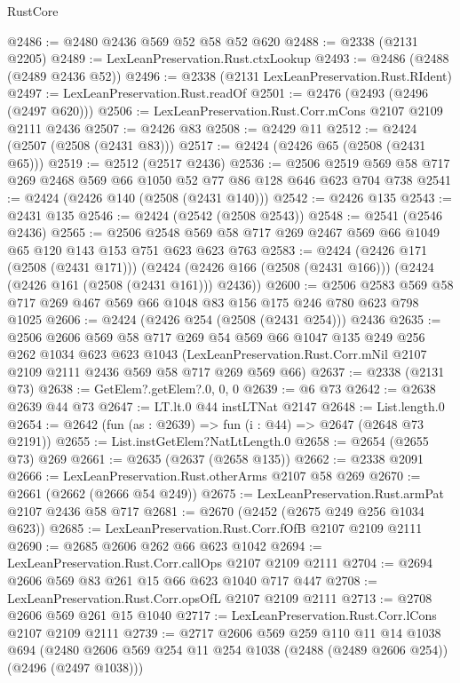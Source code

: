 \begin{lexlean}{RustCore}
\begin{coremodule}
@2486 := @2480 @2436 @569 @52 @58 @52 @620
@2488 := @2338 (@2131 @2205)
@2489 := LexLeanPreservation.Rust.ctxLookup
@2493 := @2486 (@2488 (@2489 @2436 @52))
@2496 := @2338 (@2131 LexLeanPreservation.Rust.RIdent)
@2497 := LexLeanPreservation.Rust.readOf
@2501 := @2476 (@2493 (@2496 (@2497 @620)))
@2506 := LexLeanPreservation.Rust.Corr.mCons @2107 @2109 @2111 @2436
@2507 := @2426 @83
@2508 := @2429 @11
@2512 := @2424 (@2507 (@2508 (@2431 @83)))
@2517 := @2424 (@2426 @65 (@2508 (@2431 @65)))
@2519 := @2512 (@2517 @2436)
@2536 := @2506 @2519 @569 @58 @717 @269 @2468 @569 @66 @1050 @52 @77 @86 @128 @646 @623 @704 @738
@2541 := @2424 (@2426 @140 (@2508 (@2431 @140)))
@2542 := @2426 @135
@2543 := @2431 @135
@2546 := @2424 (@2542 (@2508 @2543))
@2548 := @2541 (@2546 @2436)
@2565 := @2506 @2548 @569 @58 @717 @269 @2467 @569 @66 @1049 @65 @120 @143 @153 @751 @623 @623 @763
@2583 := @2424
    (@2426 @171 (@2508 (@2431 @171)))
    (@2424 (@2426 @166 (@2508 (@2431 @166))) (@2424 (@2426 @161 (@2508 (@2431 @161))) @2436))
@2600 := @2506 @2583 @569 @58 @717 @269 @467 @569 @66 @1048 @83 @156 @175 @246 @780 @623 @798 @1025
@2606 := @2424 (@2426 @254 (@2508 (@2431 @254))) @2436
@2635 := @2506
    @2606
    @569
    @58
    @717
    @269
    @54
    @569
    @66
    @1047
    @135
    @249
    @256
    @262
    @1034
    @623
    @623
    @1043
    (LexLeanPreservation.Rust.Corr.mNil @2107 @2109 @2111 @2436 @569 @58 @717 @269 @569 @66)
@2637 := @2338 (@2131 @73)
@2638 := GetElem?.getElem?.{0, 0, 0}
@2639 := @6 @73
@2642 := @2638 @2639 @44 @73
@2647 := LT.lt.{0} @44 instLTNat @2147
@2648 := List.length.{0}
@2654 := @2642 (fun (as : @2639) => fun (i : @44) => @2647 (@2648 @73 @2191))
@2655 := List.instGetElem?NatLtLength.{0}
@2658 := @2654 (@2655 @73) @269
@2661 := @2635 (@2637 (@2658 @135))
@2662 := @2338 @2091
@2666 := LexLeanPreservation.Rust.otherArms @2107 @58 @269
@2670 := @2661 (@2662 (@2666 @54 @249))
@2675 := LexLeanPreservation.Rust.armPat @2107 @2436 @58 @717
@2681 := @2670 (@2452 (@2675 @249 @256 @1034 @623))
@2685 := LexLeanPreservation.Rust.Corr.fOfB @2107 @2109 @2111
@2690 := @2685 @2606 @262 @66 @623 @1042
@2694 := LexLeanPreservation.Rust.Corr.callOps @2107 @2109 @2111
@2704 := @2694 @2606 @569 @83 @261 @15 @66 @623 @1040 @717 @447
@2708 := LexLeanPreservation.Rust.Corr.opsOfL @2107 @2109 @2111
@2713 := @2708 @2606 @569 @261 @15 @1040
@2717 := LexLeanPreservation.Rust.Corr.lCons @2107 @2109 @2111
@2739 := @2717
    @2606
    @569
    @259
    @110
    @11
    @14
    @1038
    @694
    (@2480 @2606 @569 @254 @11 @254 @1038 (@2488 (@2489 @2606 @254)) (@2496 (@2497 @1038)))

\end{coremodule}
\end{lexlean}
